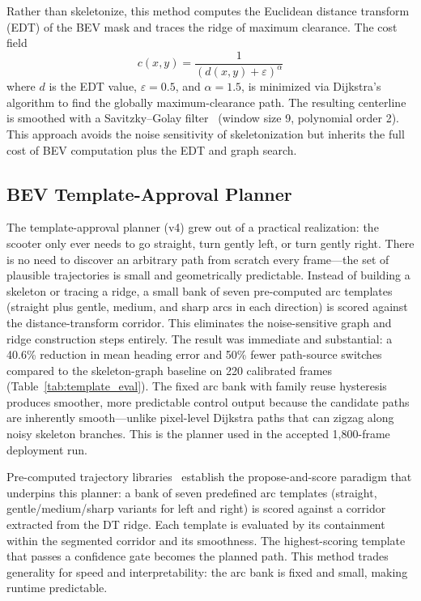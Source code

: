 \documentclass[12pt,letterpaper,oneside]{report}
\begin{document}
Rather than skeletonize, this method computes the Euclidean distance transform (EDT) of the BEV mask and traces the ridge of maximum clearance. The cost field
\begin{equation}
c(x,y) = \frac{1}{(d(x,y) + \varepsilon)^\alpha}
\end{equation}
where $d$ is the EDT value, $\varepsilon = 0.5$, and $\alpha = 1.5$, is minimized via Dijkstra's algorithm to find the globally maximum-clearance path. The resulting centerline is smoothed with a Savitzky--Golay filter~\cite{savitzky1964smoothing} (window size 9, polynomial order 2). This approach avoids the noise sensitivity of skeletonization but inherits the full cost of BEV computation plus the EDT and graph search.


\subsection{BEV Template-Approval Planner}
\label{sec:template_planner}

The template-approval planner (v4) grew out of a practical realization: the scooter only ever needs to go straight, turn gently left, or turn gently right.  There is no need to discover an arbitrary path from scratch every frame---the set of plausible trajectories is small and geometrically predictable.  Instead of building a skeleton or tracing a ridge, a small bank of seven pre-computed arc templates (straight plus gentle, medium, and sharp arcs in each direction) is scored against the distance-transform corridor.  This eliminates the noise-sensitive graph and ridge construction steps entirely.  The result was immediate and substantial: a 40.6\% reduction in mean heading error and 50\% fewer path-source switches compared to the skeleton-graph baseline on 220 calibrated frames (Table~\ref{tab:template_eval}).  The fixed arc bank with family reuse hysteresis produces smoother, more predictable control output because the candidate paths are inherently smooth---unlike pixel-level Dijkstra paths that can zigzag along noisy skeleton branches.  This is the planner used in the accepted 1,800-frame deployment run.

Pre-computed trajectory libraries~\cite{howard2007trajectory} establish the propose-and-score paradigm that underpins this planner: a bank of seven predefined arc templates (straight, gentle/medium/sharp variants for left and right) is scored against a corridor extracted from the DT ridge. Each template is evaluated by its containment within the segmented corridor and its smoothness. The highest-scoring template that passes a confidence gate becomes the planned path. This method trades generality for speed and interpretability: the arc bank is fixed and small, making runtime predictable.
\end{document}
